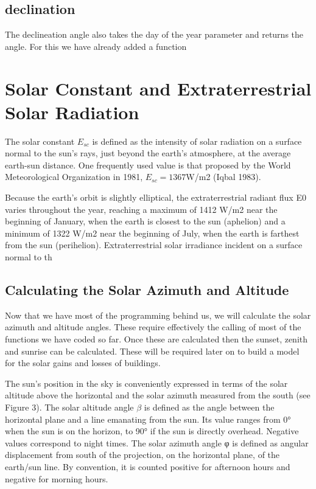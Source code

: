 \subsection{declination}

The declineation angle also takes the day of the year parameter and returns the angle. For this we have already
added a function


\section{Solar Constant and Extraterrestrial Solar Radiation}

The solar constant $E_{sc}$ is defined as the intensity of solar radiation
on a surface normal to the sun's rays, just beyond the earth's
atmosphere, at the average earth-sun distance. One frequently used
value is that proposed by the World Meteorological Organization in
1981, $E_{sc} = 1367$W/m2 (Iqbal 1983).


Because the earth's orbit is slightly elliptical, the extraterrestrial
radiant flux E0 varies throughout the year, reaching a maximum
of 1412 W/m2 near the beginning of January, when the earth
is closest to the sun (aphelion) and a minimum of 1322 W/m2 near
the beginning of July, when the earth is farthest from the sun (perihelion).
Extraterrestrial solar irradiance incident on a surface normal
to th


\subsection{Calculating the Solar Azimuth and Altitude}

Now that we have most of the programming behind us, we will calculate the solar azimuth and altitude angles. These require effectively the calling of most of the functions we have coded so far. Once these are calculated then the sunset, zenith and sunrise can be calculated. These will be required later on to build a model for the solar gains and losses of buildings. 

The sun's position in the sky is conveniently expressed in terms
of the solar altitude above the horizontal and the solar azimuth measured
from the south (see Figure 3). The solar altitude angle $\beta$ is
defined as the angle between the horizontal plane and a line emanating
from the sun. Its value ranges from 0° when the sun is on the
horizon, to 90° if the sun is directly overhead. Negative values
correspond to night times. The solar azimuth angle φ is defined as
angular displacement from south of the projection, on the horizontal
plane, of the earth/sun line. By convention, it is counted positive for
afternoon hours and negative for morning hours.


